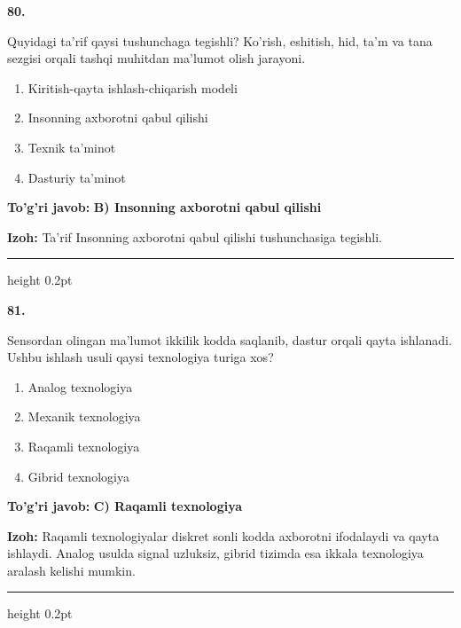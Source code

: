 \documentclass[10pt,a4paper,oneside]{article}
\begin{document}
\noindent\textbf{\color{ink}80.}
\par
Quyidagi ta'rif qaysi tushunchaga tegishli? Ko'rish, eshitish, hid, ta'm va tana sezgisi orqali tashqi muhitdan ma'lumot olish jarayoni.
\begin{enumerate}[label=\Alph*),leftmargin=9mm]
\item Kiritish-qayta ishlash-chiqarish modeli
\item Insonning axborotni qabul qilishi
\item Texnik ta'minot
\item Dasturiy ta'minot
\end{enumerate}
\begin{tcolorbox}[enhanced,breakable,colback=teal!4,colframe=teal!50!black,boxrule=0.5pt,arc=1.1mm,left=3mm,right=3mm,top=1.7mm,bottom=1.7mm,before skip=2mm,after skip=2mm]
\textbf{\color{teal}To'g'ri javob:} \textbf{B) Insonning axborotni qabul qilishi}
\par\smallskip
\textbf{Izoh:} Ta'rif Insonning axborotni qabul qilishi tushunchasiga tegishli.
\end{tcolorbox}
\vspace{2mm}\hrule height 0.2pt \vspace{3mm}

\noindent\textbf{\color{ink}81.}
\par
Sensordan olingan ma'lumot ikkilik kodda saqlanib, dastur orqali qayta ishlanadi. Ushbu ishlash usuli qaysi texnologiya turiga xos?
\begin{enumerate}[label=\Alph*),leftmargin=9mm]
\item Analog texnologiya
\item Mexanik texnologiya
\item Raqamli texnologiya
\item Gibrid texnologiya
\end{enumerate}
\begin{tcolorbox}[enhanced,breakable,colback=teal!4,colframe=teal!50!black,boxrule=0.5pt,arc=1.1mm,left=3mm,right=3mm,top=1.7mm,bottom=1.7mm,before skip=2mm,after skip=2mm]
\textbf{\color{teal}To'g'ri javob:} \textbf{C) Raqamli texnologiya}
\par\smallskip
\textbf{Izoh:} Raqamli texnologiyalar diskret sonli kodda axborotni ifodalaydi va qayta ishlaydi. Analog usulda signal uzluksiz, gibrid tizimda esa ikkala texnologiya aralash kelishi mumkin.
\end{tcolorbox}
\vspace{2mm}\hrule height 0.2pt \vspace{3mm}
\end{document}
